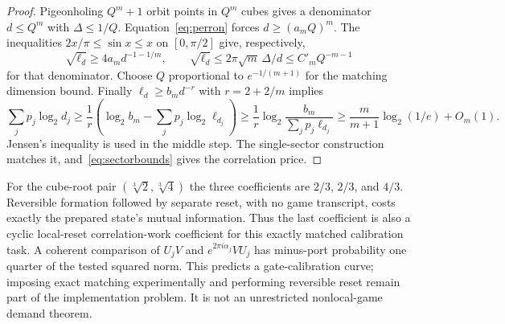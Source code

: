 \begin{proof}
Pigeonholing $Q^m+1$ orbit points in $Q^m$ cubes gives a denominator $d\le Q^m$ with $\Delta\le1/Q$. Equation~\eqref{eq:perron} forces $d\ge(a_mQ)^m$. The inequalities $2x/\pi\le\sin x\le x$ on $[0,\pi/2]$ give, respectively,
\[
 \sqrt{\ell_d}\ge4a_m d^{-1-1/m},\qquad
 \sqrt{\ell_d}\le2\pi\sqrt m\,\Delta/d\le C'_mQ^{-m-1}
\]
for that denominator. Choose $Q$ proportional to $e^{-1/(m+1)}$ for the matching dimension bound. Finally $\ell_d\ge b_md^{-r}$ with $r=2+2/m$ implies
\[
 \sum_jp_j\log_2d_j
 \ge\frac1r\left(\log_2b_m-\sum_jp_j\log_2\ell_{d_j}\right)
 \ge\frac1r\log_2\frac{b_m}{\sum_jp_j\ell_{d_j}}
 \ge\frac m{m+1}\log_2(1/e)+O_m(1).
\]
Jensen's inequality is used in the middle step. The single-sector construction matches it, and~\eqref{eq:sectorbounds} gives the correlation price.
\end{proof}

For the cube-root pair $(\sqrt[3]2,\sqrt[3]4)$ the three coefficients are $2/3$, $2/3$, and $4/3$. Reversible formation followed by separate reset, with no game transcript, costs exactly the prepared state's mutual information. Thus the last coefficient is also a cyclic local-reset correlation-work coefficient for this exactly matched calibration task. A coherent comparison of $U_jV$ and $e^{2\pi i\alpha_j}VU_j$ has minus-port probability one quarter of the tested squared norm. This predicts a gate-calibration curve; imposing exact matching experimentally and performing reversible reset remain part of the implementation problem. It is not an unrestricted nonlocal-game demand theorem.
